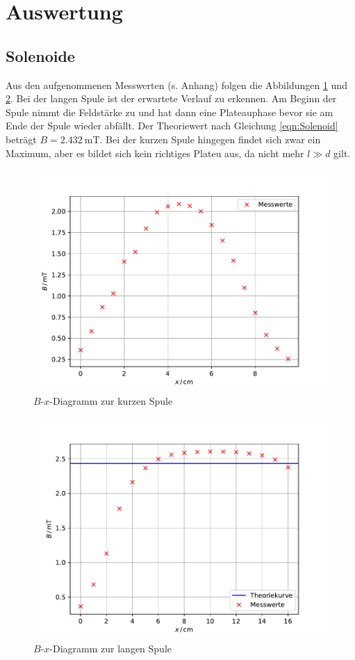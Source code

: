\section{Auswertung}

\subsection{Solenoide \label{sec:sol}}

Aus den aufgenommenen Messwerten (s. Anhang) folgen die Abbildungen \ref{fig:kurz} und \ref{fig:lang}.
Bei der langen Spule ist der erwartete Verlauf zu erkennen. Am Beginn der Spule nimmt die Feldstärke zu
und hat dann eine Plateauphase bevor sie am Ende der Spule wieder abfällt.
Der Theoriewert nach Gleichung \eqref{eqn:Solenoid} beträgt $B = \SI{2,432}{\milli \tesla}$.
Bei der kurzen Spule hingegen findet sich zwar ein Maximum, aber es bildet sich kein richtiges Plateu aus,
da nicht mehr $l \gg d$ gilt.
\begin{figure}[H]
  \centering
  \includegraphics[width=\textwidth]{Plots/kurz.pdf}
  \caption{$B$-$x$-Diagramm zur kurzen Spule}
  \label{fig:kurz}
\end{figure}
\begin{figure}[H]
  \centering
  \includegraphics[width=\textwidth]{Plots/lang.pdf}
  \caption{$B$-$x$-Diagramm zur langen Spule}
  \label{fig:lang}
\end{figure}


